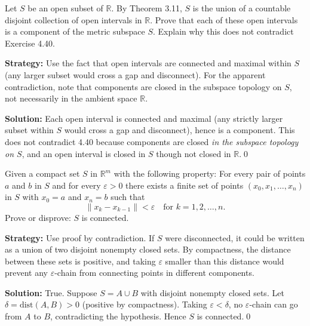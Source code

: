 \begin{problembox}
\begin{problemstatement}
Let $S$ be an open subset of $\mathbb{R}$. By Theorem 3.11, $S$ is the union of a countable disjoint collection of open intervals in $\mathbb{R}$. Prove that each of these open intervals is a component of the metric subspace $S$. Explain why this does not contradict Exercise 4.40.
\end{problemstatement}
\end{problembox}

\noindent\textbf{Strategy:} Use the fact that open intervals are connected and maximal within $S$ (any larger subset would cross a gap and disconnect). For the apparent contradiction, note that components are closed in the subspace topology on $S$, not necessarily in the ambient space $\mathbb{R}$.

\bigskip\noindent\textbf{Solution:}
Each open interval is connected and maximal (any strictly larger subset within $S$ would cross a gap and disconnect), hence is a component. This does not contradict 4.40 because components are closed \emph{in the subspace topology on $S$}, and an open interval is closed in $S$ though not closed in $\mathbb{R}$.\qed



\begin{problembox}
\begin{problemstatement}
Given a compact set $S$ in $\mathbb{R}^m$ with the following property: For every pair of points $a$ and $b$ in $S$ and for every $\varepsilon > 0$ there exists a finite set of points $(x_0, x_1, \ldots, x_n)$ in $S$ with $x_0 = a$ and $x_n = b$ such that
\[\|x_k - x_{k-1}\| < \varepsilon \quad \text{for } k = 1, 2, \ldots, n.\]
Prove or disprove: $S$ is connected.
\end{problemstatement}
\end{problembox}

\noindent\textbf{Strategy:} Use proof by contradiction. If $S$ were disconnected, it could be written as a union of two disjoint nonempty closed sets. By compactness, the distance between these sets is positive, and taking $\varepsilon$ smaller than this distance would prevent any $\varepsilon$-chain from connecting points in different components.

\bigskip\noindent\textbf{Solution:}
True. Suppose $S=A\cup B$ with disjoint nonempty closed sets. Let $\delta=\mathrm{dist}(A,B)>0$ (positive by compactness). Taking $\varepsilon<\delta$, no $\varepsilon$-chain can go from $A$ to $B$, contradicting the hypothesis. Hence $S$ is connected.\qed



